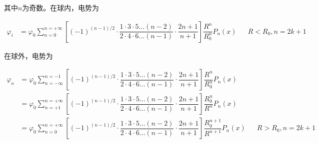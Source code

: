 \documentclass{article}
\begin{document}
其中$n$为奇数。在球内，电势为

\begin{equation*}
  \begin{aligned}
    \varphi_i &=
    \varphi_0 \sum_{n=0}^{n=+\infty}  \left[ \left( -1  \right)^{\left( n-1 \right)/ 2} \cdot \dfrac{1 \cdot 3 \cdot 5 \dots \left( n-2 \right)}{2 \cdot 4 \cdot 6 \dots \left( n-1 \right)} \cdot \dfrac{2n+1}{n+1} \right] \dfrac{R^n }{R_0^n} P_n \left( x \right) && R<R_0,n=2k+1
  \end{aligned}
\end{equation*}

在球外，电势为

\begin{equation*}
  \begin{aligned}
    \varphi_o &=
    \varphi_0 \sum_{n=- \infty}^{n=-1}  \left[ \left( -1  \right)^{\left( n-1 \right)/ 2} \cdot \dfrac{1 \cdot 3 \cdot 5 \dots \left( n-2 \right)}{2 \cdot 4 \cdot 6 \dots \left( n-1 \right)} \cdot \dfrac{2n+1}{n+1} \right] \dfrac{R^n }{R_0^n} P_n \left( x \right) \\
    &= \varphi_0 \sum_{n=+1}^{n=+ \infty}  \left[ \left( -1  \right)^{\left( n-1 \right)/ 2} \cdot \dfrac{1 \cdot 3 \cdot 5 \dots \left( n-2 \right)}{2 \cdot 4 \cdot 6 \dots \left( n-1 \right)} \cdot \dfrac{2n+1}{n+1} \right] \dfrac{R_0^n }{R^n} P_n \left( x \right) \\
    &= \varphi_0 \sum_{n=0}^{n=+ \infty}  \left[ \left( -1  \right)^{\left( n-1 \right)/ 2} \cdot \dfrac{1 \cdot 3 \cdot 5 \dots \left( n-2 \right)}{2 \cdot 4 \cdot 6 \dots \left( n-1 \right)} \cdot \dfrac{2n+1}{n+1} \right] \dfrac{R_0^{n+1} }{R^{n+1}} P_n \left( x \right) && R>R_0,n=2k+1
  \end{aligned}
\end{equation*}
\end{document}
